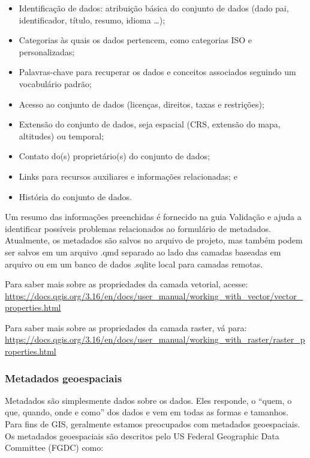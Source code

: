 \documentclass[
]{book}
\providecommand{\tightlist}{%
  \setlength{\itemsep}{0pt}\setlength{\parskip}{0pt}}
\begin{document}
\begin{itemize}
\tightlist
\item
  Identificação de dados: atribuição básica do conjunto de dados (dado pai, identificador, título, resumo, idioma \ldots);
\item
  Categorias às quais os dados pertencem, como categorias ISO e personalizadas;
\item
  Palavras-chave para recuperar os dados e conceitos associados seguindo um vocabulário padrão;
\item
  Acesso ao conjunto de dados (licenças, direitos, taxas e restrições);
\item
  Extensão do conjunto de dados, seja espacial (CRS, extensão do mapa, altitudes) ou temporal;
\item
  Contato do(s) proprietário(s) do conjunto de dados;
\item
  Links para recursos auxiliares e informações relacionadas; e
\item
  História do conjunto de dados.
\end{itemize}

Um resumo das informações preenchidas é fornecido na guia Validação e ajuda a identificar possíveis problemas relacionados ao formulário de metadados. Atualmente, os metadados são salvos no arquivo de projeto, mas também podem ser salvos em um arquivo .qmd separado ao lado das camadas baseadas em arquivo ou em um banco de dados .sqlite local para camadas remotas.

Para saber mais sobre as propriedades da camada vetorial, acesse: \href{https://docs.qgis.org/3.16/en\%20/docs/user_manual/working_with_vector/vector_properties.html}{https://docs.qgis.org/3.16/en/docs/user\_manual/working\_with\_vector/vector\_properties.html}

Para saber mais sobre as propriedades da camada raster, vá para: \href{https:\%20//docs.qgis.org/3.16/en/docs/user_manual/working_with_raster/raster_properties.html}{https://docs.qgis.org/3.16/en/docs/user\_manual/working\_with\_raster/raster\_properties.html}

\hypertarget{metadados-geoespaciais}{%
\subsubsection{\texorpdfstring{\textbf{Metadados geoespaciais}}{Metadados geoespaciais}}\label{metadados-geoespaciais}}

Metadados são simplesmente dados sobre os dados. Eles responde, o ``quem, o que, quando, onde e como'' dos dados e vem em todas as formas e tamanhos. Para fins de GIS, geralmente estamos preocupados com metadados geoespaciais. Os metadados geoespaciais são descritos pelo US Federal Geographic Data Committee (FGDC) como:
\end{document}
